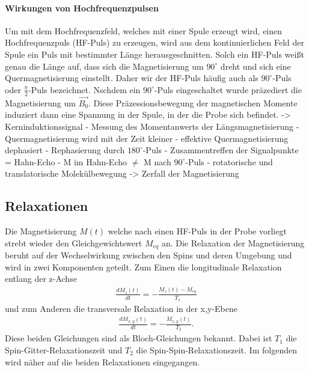 \paragraph{Wirkungen von Hochfrequenzpulsen}
Um mit dem Hochfrequenzfeld, welches mit einer Spule erzeugt wird, einen Hochfrequenzpuls (HF-Puls) zu erzeugen, wird aus dem kontinuierlichen Feld der Spule ein Puls mit bestimmter L\"{a}nge herausgeschnitten.
Solch ein HF-Puls wei{\ss}t genau die L\"{a}nge auf, dass sich die Magnetisierung um $90^{\circ}$ dreht und sich eine Quermagnetisierung einstellt.
Daher wir der HF-Puls h\"{a}ufig auch als $90^{\circ}$-Puls oder $\frac{\pi}{2}$-Puls bezeichnet.
Nschdem ein $90^{\circ}$-Puls eingeschaltet wurde pr\"{a}zediert die Magnetisierung um $\overrightarrow{B_0}$.
Diese Pr\"{a}zessionsbewegung der magnetischen Momente induziert dann eine Spannung in der Spule, in der die Probe sich befindet.
-> Kerninduktionssignal
- Messung des Momentanwerts der L\"{a}ngsmagnetisierung
- Quermagnetisierung wird mit der Zeit kleiner
- effektive Quermagnetisierung dephasiert
- Rephasierung durch $180^{\circ}$-Puls
- Zusammentreffen der Signalpunkte = Hahn-Echo
- M im Hahn-Echo $\neq$ M nach $90^{\circ}$-Puls
- rotatorische und translatorische Molek\"{u}lbewegung -> Zerfall der Magnetisierung


\subsection{Relaxationen}
Die Magnetisierung $M(t)$ welche nach einen HF-Puls in der Probe vorliegt strebt wieder den Gleichgewichtswert $M_{eq}$ an.
Die Relaxation der Magnetisierung beruht auf der Wechselwirkung zwischen den Spins und deren Umgebung und wird in zwei Komponenten geteilt.
Zum Einen die longitudinale Relaxation entlang der z-Achse
\begin{align}
	\frac{d M_z(t)}{d t} = - \frac{M_z(t) - M_{eq}}{T_1}
\end{align}
und zum Anderen die transversale Relaxation in der x,y-Ebene
\begin{align}
	\frac{d M_{x,y}(t)}{d t} = - \frac{M_{x,y}(t)}{T_2} .
\end{align}
Diese beiden Gleichungen sind als Bloch-Gleichungen bekannt.
Dabei ist $T_1$ die Spin-Gitter-Relaxationszeit und $T_2$ die Spin-Spin-Relaxationszeit.
Im folgenden wird n\"{a}her auf die beiden Relaxationen eingegangen.

